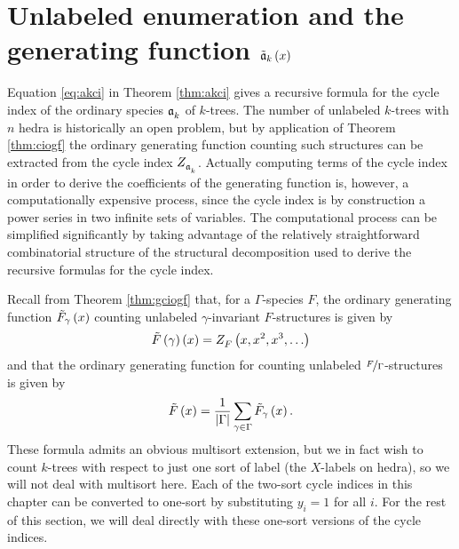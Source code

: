 \documentclass[distribution,draft]{brandiss} %
\numberwithin{section}{chapter}
\numberwithin{figure}{chapter}
\begin{document}
\section{Unlabeled enumeration and the generating function $\tilde{\mathfrak{a}}_{k} \left( {x} \right)$}\label{ss:ktunlenum}
Equation \eqref{eq:akci} in Theorem \ref{thm:akci} gives a recursive formula for the cycle index of the ordinary species $\mathfrak{a}_{k}^{}$ of $k$-trees.
The number of unlabeled $k$-trees with $n$ hedra is historically an open problem, but by application of Theorem \ref{thm:ciogf} the ordinary generating function counting such structures can be extracted from the cycle index $ Z_{\mathfrak{a}_{k}^{}}^{} $.
Actually computing terms of the cycle index in order to derive the coefficients of the generating function is, however, a computationally expensive process, since the cycle index is by construction a power series in two infinite sets of variables.
The computational process can be simplified significantly by taking advantage of the relatively straightforward combinatorial structure of the structural decomposition used to derive the recursive formulas for the cycle index.

Recall from Theorem \ref{thm:gciogf} that, for a $\Gamma$-species $F$, the ordinary generating function $\tilde{F}_{\gamma} \left( {x} \right)$ counting unlabeled $\gamma$-invariant $F$-structures is given by
\[\tilde{F} \left( {\gamma} \right) \left( {x} \right) =  Z_{F}^{} \left( {x, x^2, x^3, \dots} \right) \]
and that the ordinary generating function for counting unlabeled $\nicefrac{F}{\Gamma}$-structures is given by
\[\tilde{F} \left( {x} \right) = \frac{1}{\left\vert {\Gamma} \right\vert} \sum_{\gamma \in \Gamma} \tilde{F}_{\gamma} \left( {x} \right).\]
These formula admits an obvious multisort extension, but we in fact wish to count $k$-trees with respect to just one sort of label (the $X$-labels on hedra), so we will not deal with multisort here.
Each of the two-sort cycle indices in this chapter can be converted to one-sort by substituting $y_{i} = 1$ for all $i$.
For the rest of this section, we will deal directly with these one-sort versions of the cycle indices.
\end{document}
